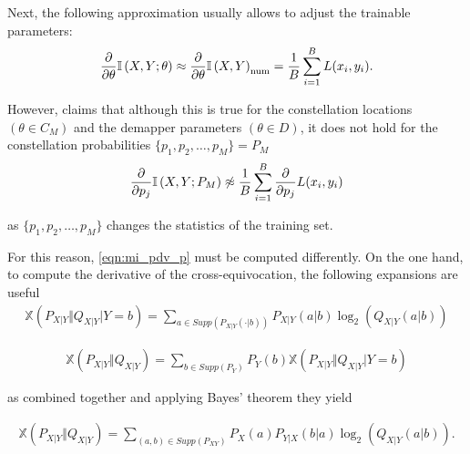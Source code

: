 Next, the following approximation usually allows to adjust the trainable parameters:
\begin{align}
	\pdv{\theta} \mathbb{I} \left(X , Y ; \theta \right) \approx \pdv{\theta} \mathbb{I} \left(X , Y\right)_{\text{num}} = \dfrac{1}{B} \sum \limits_{i = 1}^{B} L(x_i, y_i).
\end{align}

However, \citep{Aref} claims that although this is true for the constellation locations $(\theta \in C_M)$ and the demapper parameters $(\theta \in D)$, it does not hold for the constellation probabilities $\{p_1, p_2, \dots, p_M\} = P_M$
\begin{align}
\label{eqn:mi_pdv_p}
	\pdv{p_j} \mathbb{I} \left(X , Y ; P_M \right) \not\approx \dfrac{1}{B} \sum \limits_{i = 1}^{B} \pdv{p_j} L(x_i, y_i)
\end{align}

as $\{p_1, p_2, \dots, p_M\}$ changes the statistics of the training set.

For this reason, \ref{eqn:mi_pdv_p} must be computed differently. On the one hand, to compute the derivative of the cross-equivocation, the following expansions are useful
\begin{align}
	\mathbb{X}\left(P_{X|Y} \Vert Q_{X|Y} \vert Y=b \right) = \sum \limits_{a \in Supp(P_{X|Y}(\cdot|b))} P_{X|Y}(a|b) \log_2(Q_{X|Y}(a|b))
\end{align}

\begin{align}
	\mathbb{X}\left(P_{X|Y} \Vert Q_{X|Y}\right) = \sum \limits_{b \in Supp(P_Y)} P_Y(b) \mathbb{X}\left( P_{X|Y} \Vert Q_{X|Y} \vert Y=b \right) 
\end{align}

as combined together and applying Bayes' theorem they yield

\begin{align}
\label{eqn:CE_expanded}
	\mathbb{X}\left(P_{X|Y} \Vert Q_{X|Y}\right) = \sum \limits_{(a,b) \in Supp(P_{XY})} P_X(a) P_{Y|X}(b|a) \log_2(Q_{X|Y}(a|b)). 
\end{align}


